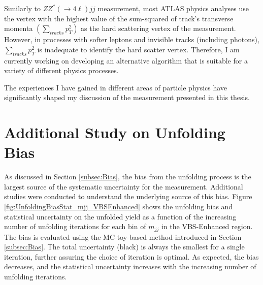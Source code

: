 Similarly to $ZZ^*(\rightarrow 4\ell)jj$ measurement, most ATLAS physics analyses use the vertex with the highest value of the sum-squared of track's transverse momenta $(\sum_{tracks}{p_{T}^2})$ as the hard scattering vertex of the measurement. However, in processes with softer leptons and invisible tracks (including photons), $\sum_{tracks}{p_{T}^2}$ is inadequate to identify the hard scatter vertex. Therefore, I am currently working on developing an alternative algorithm that is suitable for a variety of different physics processes. 

The experiences I have gained in different areas of particle physics have significantly shaped my discussion of the measurement presented in this thesis.  

\section{Additional Study on Unfolding Bias}
\label{Appendix:Unfolding_bias}
As discussed in Section \ref{subsec:Bias}, the bias from the unfolding process is the largest source of the systematic uncertainty for the measurement. Additional studies were conducted to understand the underlying source of this bias. Figure \ref{fig:UnfoldingBiasStat_mjj_VBSEnhanced} shows the unfolding bias and statistical uncertainty on the unfolded yield as a function of the increasing number of unfolding iterations for each bin of $m_{jj}$ in the VBS-Enhanced region. The bias is evaluated using the MC-toy-based method introduced in Section \ref{subsec:Bias}. The total uncertainty (black) is always the smallest for a single iteration, further assuring the choice of iteration is optimal. As expected, the bias decreases, and the statistical uncertainty increases with the increasing number of unfolding iterations.

